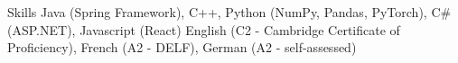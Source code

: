 \section{\faGears}{Skills}
\resumeEntryStart
   {
    Java (Spring Framework), C++, Python (NumPy, Pandas, PyTorch), C\# (ASP.NET), Javascript (React)
  }
   {
    English (C2 - Cambridge Certificate of Proficiency), French (A2 - DELF), German (A2 - self-assessed)}
  \resumeEntryEnd
